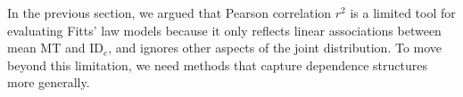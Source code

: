 \documentclass[acmlarge, manuscript,review]{acmart}
\begin{document}





In the previous section, we argued that Pearson correlation $r^2$ is a limited tool for evaluating Fitts' law models because it only reflects linear associations between mean MT and ID$_e$, and ignores other aspects of the joint distribution. To move beyond this limitation, we need methods that capture dependence structures more generally.
\end{document}
